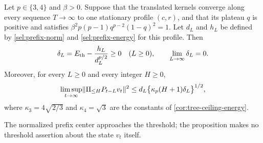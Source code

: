 \begin{proposition}
\label{sel:threshold-centers}
Let $p\in\{3,4\}$ and $\beta>0$. Suppose that the translated kernels converge along every sequence $T\to\infty$ to one stationary profile $(c,r)$, and that its plateau $q$ is positive and satisfies $\beta^2p(p-1)q^{p-2}(1-q)^2=1$. Let $d_L$ and $h_L$ be defined by \eqref{sel:prefix-norm} and \eqref{sel:prefix-energy} for this profile. Then
\begin{equation}
 \delta_L=E_{\mathrm{th}}-\frac{h_L}{d_L^{p/2}}\ge0\quad(L\ge0),
 \qquad \lim_{L\to\infty}\delta_L=0.
 \label{sel:center-deficit}
\end{equation}
Moreover, for every $L\ge0$ and every integer $H\ge0$,
\begin{equation}
 \limsup_{t\to\infty}
 \lVert\Pi_{\le H}P_{t-L}v_t\rVert^2
 \le d_L\bigl\{\kappa_p(H+1)\delta_L\bigr\}^{1/2},
 \label{sel:low-height-center-bound}
\end{equation}
where $\kappa_3=4\sqrt{2/3}$ and $\kappa_4=\sqrt3$ are the constants of \cref{cor:tree-ceiling-energy}.
\end{proposition}

The normalized prefix center approaches the threshold; the proposition makes no threshold assertion about the state $v_t$ itself.

